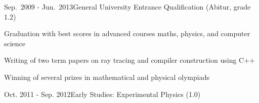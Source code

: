 \documentclass[a4paper,10pt]{cv}
\begin{document}
  \cvHeadNoImage
      \begin{cvTimeItem}{Sep.~2009 - Jun.~2013}{General University Entrance Qualification (Abitur, grade 1.2)}
        \begin{cvItemize}
          \item Graduation with best scores in advanced courses maths, physics, and computer science
          \item Writing of two term papers on ray tracing and compiler construction using C++
          \item Winning of several prizes in mathematical and physical olympiads
        \end{cvItemize}
      \end{cvTimeItem}

      \begin{cvTimeItem}{Oct. 2011 - Sep. 2012}{Early Studies: Experimental Physics (1.0)}
      \end{cvTimeItem}
\end{document}
